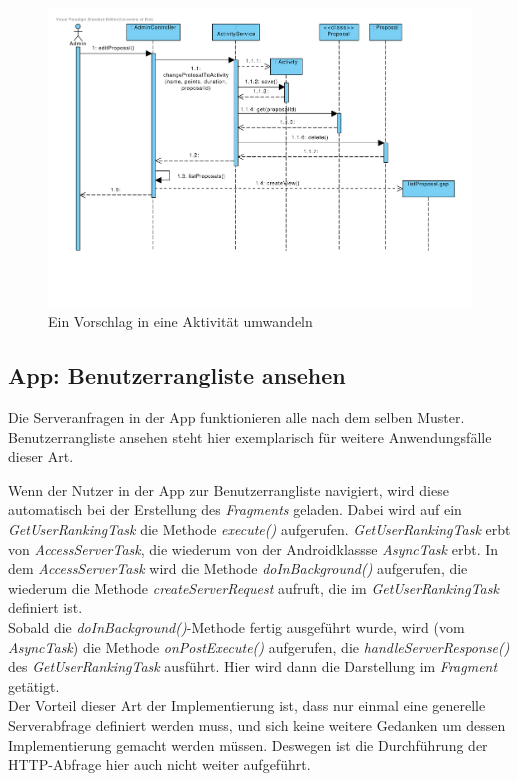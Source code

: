 \begin{figure}[H]
  \centering
  \includegraphics[width=16cm, trim= 1cm 3cm 1cm 1cm, clip, angle=90]{gfx/vorschlag_in_aktivitaet_umwandeln}
  \caption{Ein Vorschlag in eine Aktivität umwandeln}
\end{figure}


\subsection{App: Benutzerrangliste ansehen}
Die Serveranfragen in der App funktionieren alle nach dem selben
Muster. Benutzerrangliste ansehen steht hier exemplarisch für weitere
Anwendungsfälle dieser Art.


Wenn der Nutzer in der App zur Benutzerrangliste navigiert, wird diese automatisch bei der Erstellung des \emph{Fragments} geladen. Dabei wird auf ein \emph{GetUserRankingTask} die Methode \emph{execute()} aufgerufen. \emph{GetUserRankingTask} erbt von \emph{AccessServerTask}, die wiederum von der Androidklassse \emph{AsyncTask} erbt. In dem \emph{AccessServerTask} wird die Methode \emph{doInBackground()} aufgerufen, die wiederum die Methode \emph{createServerRequest} aufruft, die im \emph{GetUserRankingTask} definiert ist.\\
Sobald die \emph{doInBackground()}-Methode fertig ausgeführt wurde, wird (vom \emph{AsyncTask}) die Methode \emph{onPostExecute()} aufgerufen, die \emph{handleServerResponse()} des \emph{GetUserRankingTask} ausführt. Hier wird dann die Darstellung im \emph{Fragment} getätigt.\\
Der Vorteil dieser Art der Implementierung ist, dass nur einmal eine generelle Serverabfrage definiert werden muss, und sich keine weitere Gedanken um dessen Implementierung gemacht werden m\"ussen. Deswegen ist die Durchführung der HTTP-Abfrage hier auch nicht weiter aufgeführt.